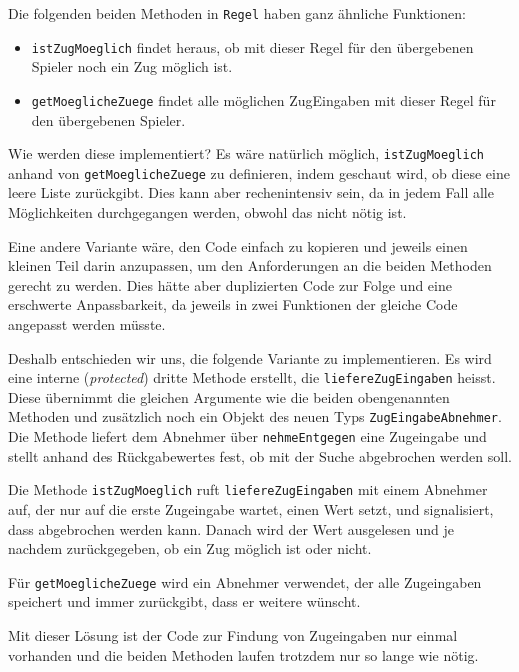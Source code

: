 \documentclass[12pt,halfparskip]{scrartcl}
\begin{document}
Die folgenden beiden Methoden in \texttt{Regel} haben ganz ähnliche Funktionen:

\begin{itemize}
	\item \texttt{istZugMoeglich} findet heraus, ob mit dieser Regel für den übergebenen Spieler noch ein Zug möglich ist.
	\item \texttt{getMoeglicheZuege} findet alle möglichen ZugEingaben mit dieser Regel für den übergebenen Spieler.
\end{itemize}

Wie werden diese implementiert? Es wäre natürlich möglich, \texttt{istZugMoeglich} anhand von \texttt{getMoeglicheZuege} zu definieren, indem geschaut wird, ob diese eine leere Liste zurückgibt. Dies kann aber rechenintensiv sein, da in jedem Fall alle Möglichkeiten durchgegangen werden, obwohl das nicht nötig ist.

Eine andere Variante wäre, den Code einfach zu kopieren und jeweils einen kleinen Teil darin anzupassen, um den Anforderungen an die beiden Methoden gerecht zu werden. Dies hätte aber duplizierten Code zur Folge und eine erschwerte Anpassbarkeit, da jeweils in zwei Funktionen der gleiche Code angepasst werden müsste.


Deshalb entschieden wir uns, die folgende Variante zu implementieren. Es wird eine interne (\emph{protected}) dritte Methode erstellt, die \texttt{liefereZugEingaben} heisst. Diese übernimmt die gleichen Argumente wie die beiden obengenannten Methoden und zusätzlich noch ein Objekt des neuen Typs \texttt{ZugEingabeAbnehmer}. Die Methode liefert dem Abnehmer über \texttt{nehmeEntgegen} eine Zugeingabe und stellt anhand des Rückgabewertes fest, ob mit der Suche abgebrochen werden soll.

Die Methode \texttt{istZugMoeglich} ruft \texttt{liefereZugEingaben} mit einem Abnehmer auf, der nur auf die erste Zugeingabe wartet, einen Wert setzt, und signalisiert, dass abgebrochen werden kann. Danach wird der Wert ausgelesen und je nachdem zurückgegeben, ob ein Zug möglich ist oder nicht.

Für \texttt{getMoeglicheZuege} wird ein Abnehmer verwendet, der alle Zugeingaben speichert und immer zurückgibt, dass er weitere wünscht.

Mit dieser Lösung ist der Code zur Findung von Zugeingaben nur einmal vorhanden und die beiden Methoden laufen trotzdem nur so lange wie nötig.
\end{document}
